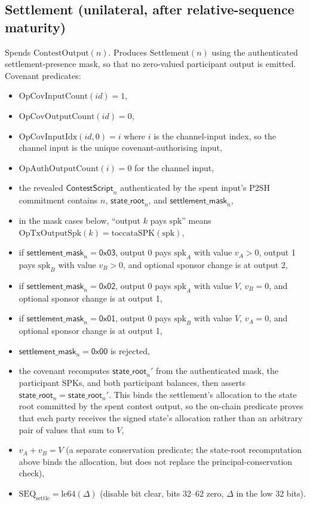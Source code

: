 \documentclass[10pt,a4paper]{article}
\begin{document}
\subsection{Settlement (unilateral, after relative-sequence maturity)}
Spends $\mathrm{ContestOutput}(n)$. Produces $\mathrm{Settlement}(n)$ using the authenticated settlement-presence mask, so that no zero-valued participant output is emitted. Covenant predicates:
\begin{itemize}
  \item $\mathrm{OpCovInputCount}(id) = 1$,
  \item $\mathrm{OpCovOutputCount}(id) = 0$,
  \item $\mathrm{OpCovInputIdx}(id, 0) = i$ where $i$ is the channel-input index, so the channel input is the unique covenant-authorising input,
  \item $\mathrm{OpAuthOutputCount}(i) = 0$ for the channel input,
  \item the revealed $\mathsf{ContestScript}_n$ authenticated by the spent input's P2SH commitment contains $n$, $\mathsf{state\_root}_n$, and $\mathsf{settlement\_mask}_n$,
  \item in the mask cases below, ``output $k$ pays $\mathrm{spk}$'' means $\mathrm{OpTxOutputSpk}(k)=\mathrm{toccataSPK}(\mathrm{spk})$,
  \item if $\mathsf{settlement\_mask}_n=\mathsf{0x03}$, output 0 pays $\mathrm{spk}_A$ with value $v_A>0$, output 1 pays $\mathrm{spk}_B$ with value $v_B>0$, and optional sponsor change is at output 2,
  \item if $\mathsf{settlement\_mask}_n=\mathsf{0x02}$, output 0 pays $\mathrm{spk}_A$ with value $V$, $v_B=0$, and optional sponsor change is at output 1,
  \item if $\mathsf{settlement\_mask}_n=\mathsf{0x01}$, output 0 pays $\mathrm{spk}_B$ with value $V$, $v_A=0$, and optional sponsor change is at output 1,
  \item $\mathsf{settlement\_mask}_n=\mathsf{0x00}$ is rejected,
  \item the covenant recomputes $\mathsf{state\_root}_n'$ from the authenticated mask, the participant SPKs, and both participant balances, then asserts $\mathsf{state\_root}_n = \mathsf{state\_root}_n'$. This binds the settlement's allocation to the state root committed by the spent contest output, so the on-chain predicate proves that each party receives the signed state's allocation rather than an arbitrary pair of values that sum to $V$,
  \item $v_A + v_B = V$ (a separate conservation predicate; the state-root recomputation above binds the allocation, but does not replace the principal-conservation check),
  \item $\mathrm{SEQ}_{\mathrm{settle}} = \mathrm{le64}(\Delta)$ (disable bit clear, bits 32--62 zero, $\Delta$ in the low 32 bits).
\end{itemize}
\end{document}
